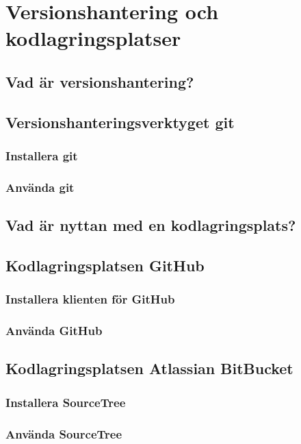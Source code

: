 

\chapter{Versionshantering och kodlagringsplatser}

\section{Vad är versionshantering?}

\section{Versionshanteringsverktyget git}

\subsection{Installera git}

\subsection{Använda git}

\section{Vad är nyttan med en kodlagringsplats?}

\section{Kodlagringsplatsen GitHub}

\subsection{Installera klienten för GitHub}

\subsection{Använda GitHub}


\section{Kodlagringsplatsen Atlassian BitBucket}

\subsection{Installera SourceTree}

\subsection{Använda SourceTree}

